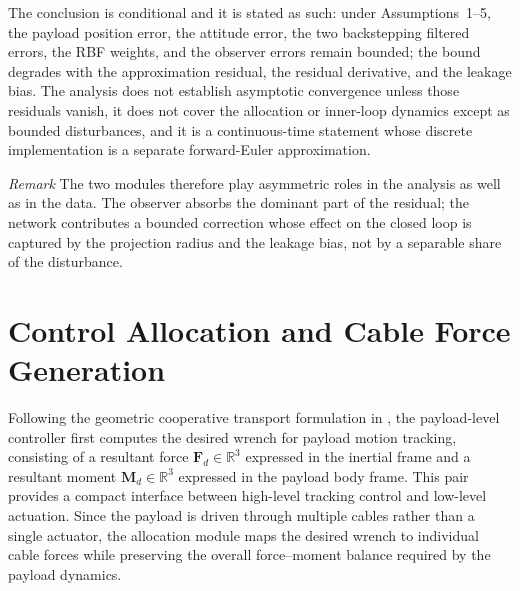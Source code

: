 \documentclass[Review,sageh,times]{sagej}
\begin{document}
The conclusion is conditional and it is stated as such: under
Assumptions~1--5, the payload position error, the attitude error, the two
backstepping filtered errors, the RBF weights, and the observer errors remain
bounded; the bound degrades with the approximation residual, the residual
derivative, and the leakage bias. The analysis does not establish asymptotic
convergence unless those residuals vanish, it does not cover the allocation
or inner-loop dynamics except as bounded disturbances, and it is a
continuous-time statement whose discrete implementation is a separate
forward-Euler approximation.

\medskip
\noindent\emph{Remark} The two modules therefore play asymmetric roles in the
analysis as well as in the data. The observer absorbs the dominant part of
the residual; the network contributes a bounded correction whose effect on
the closed loop is captured by the projection radius and the leakage bias,
not by a separable share of the disturbance.

\section*{Control Allocation and Cable Force Generation}

Following the geometric cooperative transport formulation in \citet{lee2013a},
the payload-level controller first computes the desired wrench for payload
motion tracking, consisting of a resultant force $\mathbf{F}_d\in\mathbb{R}^3$
expressed in the inertial frame and a resultant moment $\mathbf{M}_d\in\mathbb{R}^3$
expressed in the payload body frame. This pair provides a compact interface
between high-level tracking control and low-level actuation. Since the payload
is driven through multiple cables rather than a single actuator, the
allocation module maps the desired wrench to individual cable forces while
preserving the overall force--moment balance required by the payload dynamics.
\end{document}
